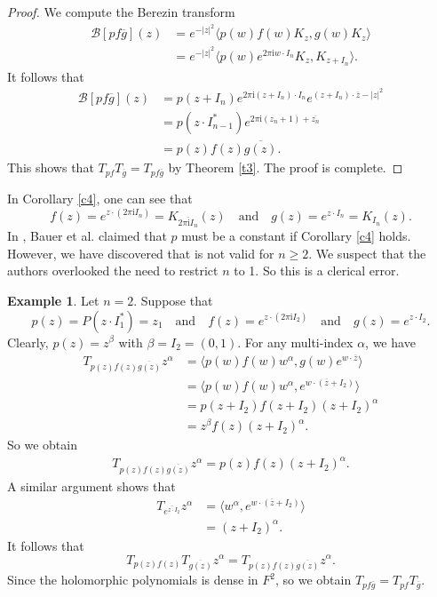 \documentclass[11pt,reqno]{amsart}
\theoremstyle{definition}
\newtheorem{exap}[theorem]{Example}
\begin{document}
\begin{proof}
We compute the Berezin transform
\begin{align*}
\mathcal{B}[pf\overline{g}](z)&=e^{-|z|^2}\langle p(w)f(w)K_z,g(w)K_z\rangle\\
&=e^{-|z|^2}\langle p(w)e^{2\pi \mathrm{i}w\cdot I_n}K_z,K_{z+I_n}\rangle.
\end{align*}
 It follows that
\begin{align*}
\mathcal{B}[pf\overline{g}](z)&=p(z+I_n)e^{2\pi \mathrm{i}(z+I_n)\cdot I_n}e^{(z+I_n)\cdot \overline{z}-|z|^2}\\
&=p(z\cdot I^*_{n-1})e^{2\pi \mathrm{i}(z_n+1)+\overline{z_n}}\\
&=p(z)f(z)\overline{g(z)}.
\end{align*}
This shows that $T_{pf}T_{\overline{g}}=T_{pf\overline{g}}$ by Theorem \ref{t3}. The proof is complete.
\end{proof}
In Corollary \ref{c4}, one can see that
$$f(z)=e^{z\cdot (2\pi \mathrm{i}I_n)}=K_{\overline{2\pi \mathrm{i}I_n}}(z) \quad\text{and}\quad g(z)=e^{z\cdot I_n}=K_{I_n}(z) .$$ In \cite[Lemma 3.4]{Bauer1}, Bauer et al. claimed that $p$ must be a constant
if Corollary \ref{c4} holds. However, we  have discovered that\cite[Lemma 3.4]{Bauer1} is not valid for $n\geq 2$.
We suspect that the authors overlooked the need to restrict $n$ to 1. So this is a clerical error. \begin{exap}
Let $n=2$. Suppose that
 $$p(z)=P(z\cdot I_1^*)=z_1\quad\text{and}\quad f(z)=e^{z\cdot (2\pi \mathrm{i}I_2)} \quad\text{and}\quad g(z)=e^{z\cdot I_2}.$$
Clearly, $p(z)=z^\beta$ with $\beta=I_2=(0,1).$
For any multi-index $\alpha$,  we have
\begin{align*}
T_{p(z)f(z)\overline{g(z)}}z^\alpha&=\langle p(w)f(w)w^\alpha , g(w)e^{w\cdot \overline{z}}\rangle\\
&=\langle p(w)f(w)w^\alpha , e^{w\cdot (\overline{z}+I_2)}\rangle\\
&=p(z+I_2)f(z+I_2)(z+I_2)^\alpha\\
&=z^{\beta} f(z)(z+I_2)^\alpha.
\end{align*}
So we obtain
\begin{align*}
T_{p(z)f(z)\overline{g(z)}}z^\alpha=p(z)f(z)(z+I_2)^\alpha.
\end{align*}
A similar argument shows that
\begin{align*}
T_{\overline{e^{z\cdot I_2}}}z^\alpha&=\langle w^\alpha, e^{w\cdot (\overline{z}+I_2)} \rangle\\
&=(z+I_2)^\alpha.
\end{align*}
It follows that $$T_{p(z)f(z)}T_{\overline{g(z)}}z^\alpha=T_{p(z)f(z)\overline{g(z)}}z^\alpha.$$
Since the holomorphic polynomials is dense in $F^2$, so we obtain $T_{pf\overline{g}}=T_{pf}T_{\overline{g}}$.
\end{exap}
\end{document}
